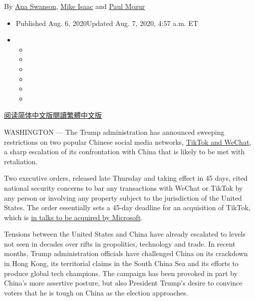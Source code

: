 By \href{https://www.nytimes3xbfgragh.onion/by/ana-swanson}{Ana
Swanson}, \href{https://www.nytimes3xbfgragh.onion/by/mike-isaac}{Mike
Isaac} and \href{https://www.nytimes3xbfgragh.onion/by/paul-mozur}{Paul
Mozur}

\begin{itemize}
\item
  Published Aug. 6, 2020Updated Aug. 7, 2020, 4:57 a.m. ET
\item
  \begin{itemize}
  \item
  \item
  \item
  \item
  \item
  \item
  \end{itemize}
\end{itemize}

\href{https://cn.nytimes3xbfgragh.onion/usa/20200807/trump-wechat-tiktok-china/}{阅读简体中文版}\href{https://cn.nytimes3xbfgragh.onion/usa/20200807/trump-wechat-tiktok-china/zh-hant/}{閱讀繁體中文版}

WASHINGTON --- The Trump administration has announced sweeping
restrictions on two popular Chinese social media networks,
\href{https://www.nytimes3xbfgragh.onion/2020/08/07/business/trump-china-wechat-tiktok.html}{TikTok
and WeChat}, a sharp escalation of its confrontation with China that is
likely to be met with retaliation.

Two executive orders, released late Thursday and taking effect in 45
days, cited national security concerns to bar any transactions with
WeChat or TikTok by any person or involving any property subject to the
jurisdiction of the United States. The order essentially sets a 45-day
deadline for an acquisition of TikTok, which is
\href{https://www.nytimes3xbfgragh.onion/2020/08/03/technology/trump-tiktok-microsoft.html}{in
talks to be acquired by Microsoft}.

Tensions between the United States and China have already escalated to
levels not seen in decades over rifts in geopolitics, technology and
trade. In recent months, Trump administration officials have challenged
China on its crackdown in Hong Kong, its territorial claims in the South
China Sea and its efforts to produce global tech champions. The campaign
has been provoked in part by China's more assertive posture, but also
President Trump's desire to convince voters that he is tough on China as
the election approaches.

